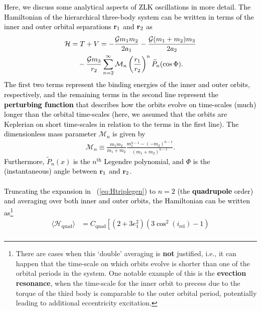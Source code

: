 \documentclass[main.tex]{subfiles}
\begin{document}
\begin{tcolorbox}[sharp corners, colback=green!30, colframe=green!80!blue, title=Box \refstepcounter{educhap3}\label{boxchap3:dynVI}\ref{boxchap3:dynVI} -- Orbital dynamics VI]
\par \textcolor{black}{Here, we discuss some analytical aspects of ZLK oscillations in more detail. The Hamiltonian of the hierarchical three-body system can be written in terms of the inner and outer orbital separations ${\mathbf{r}}_1$ and ${\mathbf{r}}_2$ as
\begin{align}
\label{eq:Htriplegen}
\nonumber \mathcal{H} &= T+V = - \frac{\mathcal{G} m_1m_2}{2a_1} - \frac{\mathcal{G}(m_1+m_2)m_3}{2 a_2} \\
&\quad - \frac{\mathcal{G} m_3}{r_2} \sum_{n=2}^\infty \mathcal{M}_n \left ( \frac{r_1}{r_2} \right )^n \widetilde{P}_n(\cos \Phi).
\end{align}
The first two terms represent the binding energies of the inner and outer orbits, respectively, and the remaining terms in the second line represent the {\bf perturbing function} that describes how the orbits evolve on time-scales (much) longer than the orbital time-scales (here, we assumed that the orbits are Keplerian on short time-scales in relation to the terms in the first line). The dimensionless mass parameter $\mathcal{M}_n$ is given by
\begin{align}
\mathcal{M}_n \equiv \frac{m_1 m_2}{m_1+m_2}\frac{m_1^{n-1} - (-m_2)^{n-1}}{(m_1+m_2)^{n-1}}.
\end{align}
Furthermore, $\widetilde{P}_n(x)$ is the $n^\mathrm{th}$ Legendre polynomial, and $\Phi$ is the (instantaneous) angle between ${\mathbf{r}}_1$ and ${\mathbf{r}}_2$. \\ \\
Truncating the expansion in \Eq~(\ref{eq:Htriplegen}) to $n=2$ (the {\bf quadrupole} order) and averaging over both inner and outer orbits, the Hamiltonian can be written as\footnote{There are cases when this `double' averaging is {\bf not} justified, i.e., it can happen that the time-scale on which orbits evolve is shorter than one of the orbital periods in the system. One notable example of this is the {\bf evection resonance}, when the time-scale for the inner orbit to precess due to the torque of the third body is comparable to the outer orbital period, potentially leading to additional eccentricity excitation. }
\begin{align}
\label{eq:Htriplequadav}
\nonumber \langle \mathcal{H}_\mathrm{quad}\rangle &= C_\mathrm{quad} \left [ \left (2 + 3 e_1^2 \right ) \left (3 \cos^2(i_\mathrm{rel}) - 1 \right ) \right. \\

\end{align}}
\end{tcolorbox}
\end{document}
